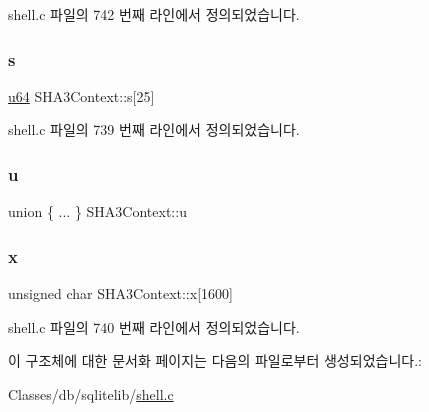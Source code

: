 shell.\+c 파일의 742 번째 라인에서 정의되었습니다.

\mbox{\label{struct_s_h_a3_context_ac353f0d611651d2f23a0da1223950f8a}} 
\subsubsection{\texorpdfstring{s}{s}}
{\footnotesize\ttfamily \hyperlink{shell_8c_a510e88e5fe50c5bcf5b3ff1ad131e109}{u64} S\+H\+A3\+Context\+::s\mbox{[}25\mbox{]}}



shell.\+c 파일의 739 번째 라인에서 정의되었습니다.

\mbox{\label{struct_s_h_a3_context_a9b772ee291e315531a1e88688ff82b69}} 
\subsubsection{\texorpdfstring{u}{u}}
{\footnotesize\ttfamily union \{ ... \}   S\+H\+A3\+Context\+::u}

\mbox{\label{struct_s_h_a3_context_afed763dce136f918c20ad99a8ec28adc}} 
\subsubsection{\texorpdfstring{x}{x}}
{\footnotesize\ttfamily unsigned char S\+H\+A3\+Context\+::x\mbox{[}1600\mbox{]}}



shell.\+c 파일의 740 번째 라인에서 정의되었습니다.



이 구조체에 대한 문서화 페이지는 다음의 파일로부터 생성되었습니다.\+:\begin{DoxyCompactItemize}
\item 
Classes/db/sqlitelib/\hyperlink{shell_8c}{shell.\+c}\end{DoxyCompactItemize}

